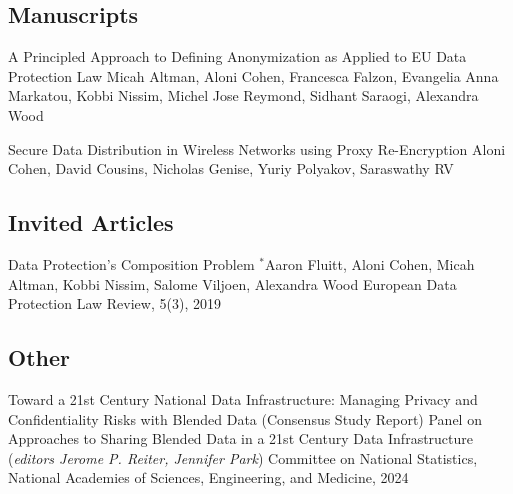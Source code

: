 \ifmanuscripts
\subsection{Manuscripts}

\begin{itemize}[label={}]

\cvpub%
{A Principled Approach to Defining Anonymization as Applied to EU Data Protection Law}
{Micah Altman, Aloni Cohen, Francesca Falzon, Evangelia Anna Markatou, Kobbi Nissim, Michel Jose Reymond, Sidhant Saraogi, Alexandra Wood}
{}
\vspace{-\baselineskip}

\cvpub%
{Secure Data Distribution in Wireless Networks using Proxy Re-Encryption}
{Aloni Cohen, David Cousins, Nicholas Genise, Yuriy Polyakov, Saraswathy RV}
{}
\vspace{-\baselineskip}

\end{itemize}
\fi


\subsection{Invited Articles}
  \begin{itemize}[label={}]

\cvpub%
{Data Protection's Composition Problem}%
{$^*$Aaron Fluitt,  Aloni Cohen, Micah Altman, Kobbi Nissim, Salome Viljoen, Alexandra Wood}%
{European Data Protection Law Review, 5(3), 2019}%
{}
  \end{itemize}

\subsection{Other}
\begin{itemize}[label={}]
    \cvpub%
    {Toward a 21st Century National Data Infrastructure: Managing Privacy and Confidentiality Risks with Blended Data (Consensus Study Report)}%
    {Panel on Approaches to Sharing Blended Data in a 21st Century Data Infrastructure (\textit{editors Jerome P. Reiter, Jennifer Park})}%
    {}%
    {Committee on National Statistics, National Academies of Sciences, Engineering, and Medicine, 2024}
\end{itemize}

